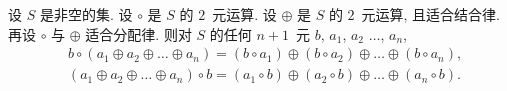 \documentclass[../libro.tex]{subfiles}
\begin{document}
\begin{theorem}
    设 \(S\) 是非空的集.
    设 \(\circ\) 是 \(S\) 的 \(2\)~元运算.
    设 \(\oplus\) 是 \(S\) 的 \(2\)~元运算,
    且适合结合律.
    再设 \(\circ\) 与 \(\oplus\) 适合分配律.
    则对 \(S\) 的任何 \(n + 1\)~元
    \(b\), \(a_1\), \(a_2\) \(\dots\), \(a_n\),
    \begin{align*}
        &
        b \circ (a_1 \oplus a_2 \oplus \dots \oplus a_n)
        =
        (b \circ a_1) \oplus (b \circ a_2) \oplus
        \dots \oplus (b \circ a_n),
        \\
        &
        (a_1 \oplus a_2 \oplus \dots \oplus a_n) \circ b
        =
        (a_1 \circ b) \oplus (a_2 \circ b) \oplus
        \dots \oplus (a_n \circ b).
    \end{align*}
\end{theorem}
\end{document}
